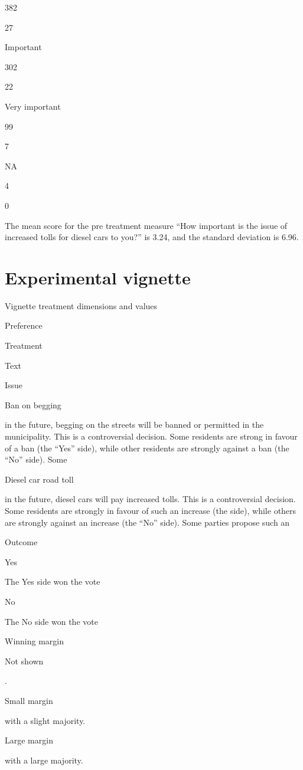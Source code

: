 \documentclass[
]{book}
\begin{document}
382

27

Important

302

22

Very important

99

7

NA

4

0

The mean score for the pre treatment measure ``How important is the
issue of increased tolls for diesel cars to you?'' is 3.24, and the
standard deviation is 6.96.

\hypertarget{experimental-vignette-2}{%
\section{Experimental vignette}\label{experimental-vignette-2}}

Vignette treatment dimensions and values

Preference

Treatment

Text

Issue

Ban on begging

in the future, begging on the streets will be banned or permitted in the
municipality. This is a controversial decision. Some residents are
strong in favour of a ban (the ``Yes'' side), while other residents are
strongly against a ban (the ``No'' side). Some

Diesel car road toll

in the future, diesel cars will pay increased tolls. This is a
controversial decision. Some residents are strongly in favour of such an
increase (the side), while others are strongly against an increase (the
``No'' side). Some parties propose such an

Outcome

Yes

The Yes side won the vote

No

The No side won the vote

Winning margin

Not shown

.

Small margin

with a slight majority.

Large margin

with a large majority.
\end{document}
